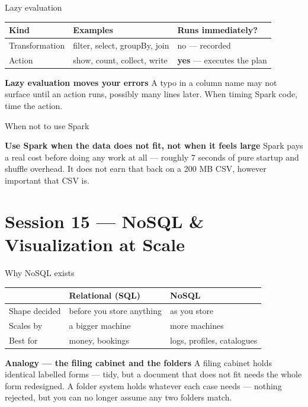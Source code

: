 \documentclass[10pt,aspectratio=169]{beamer}
\newcommand{\trapbox}[2]{%
  \begin{alertblock}{\textbf{#1}}
  #2
  \end{alertblock}%
}
\newcommand{\analogybox}[2]{%
  \begin{exampleblock}{\textbf{Analogy --- #1}}
  #2
  \end{exampleblock}%
}
\begin{document}
\begin{frame}{Lazy evaluation}
\begin{table}
\small
\begin{tabularx}{\linewidth}{@{}lXl@{}}
\toprule
\textbf{Kind} & \textbf{Examples} & \textbf{Runs immediately?} \\
\midrule
Transformation & filter, select, groupBy, join & no --- recorded \\
Action & show, count, collect, write & \textbf{yes} --- executes the plan \\
\bottomrule
\end{tabularx}
\end{table}
\trapbox{Lazy evaluation moves your errors}{A typo in a column name may not surface until an action runs, possibly many lines later. When timing Spark code, time the action.}
\end{frame}

\begin{frame}{When not to use Spark}
\trapbox{Use Spark when the data does not fit, not when it feels large}{Spark pays a real cost before doing any work at all --- roughly 7 seconds of pure startup and shuffle overhead. It does not earn that back on a 200 MB CSV, however important that CSV is.}
\end{frame}

\section{Session 15 --- NoSQL \& Visualization at Scale}

\begin{frame}{Why NoSQL exists}
\begin{table}
\small
\begin{tabularx}{\linewidth}{@{}lXX@{}}
\toprule
& \textbf{Relational (SQL)} & \textbf{NoSQL} \\
\midrule
Shape decided & before you store anything & as you store \\
Scales by & a bigger machine & more machines \\
Best for & money, bookings & logs, profiles, catalogues \\
\bottomrule
\end{tabularx}
\end{table}
\analogybox{the filing cabinet and the folders}{A filing cabinet holds identical labelled forms --- tidy, but a document that does not fit needs the whole form redesigned. A folder system holds whatever each case needs --- nothing rejected, but you can no longer assume any two folders match.}
\end{frame}
\end{document}

